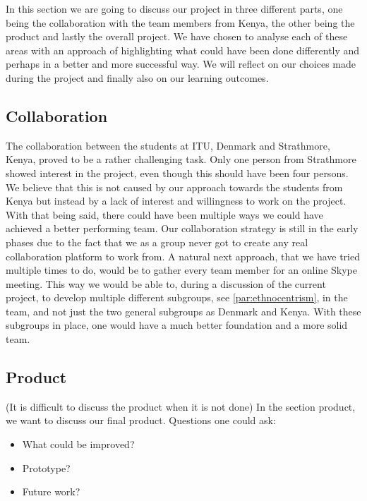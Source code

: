 In this section we are going to discuss our project in three different parts, one being the collaboration with the team members from Kenya, the other being the product and lastly the overall project. We have chosen to analyse each of these areas with an approach of highlighting what could have been done differently and perhaps in a better and more successful way. We will reflect on our choices made during the project and finally also on our learning outcomes.

\subsection{Collaboration}\label{subsec:collaboration}
The collaboration between the students at ITU, Denmark and Strathmore, Kenya, proved to be a rather challenging task. Only one person from Strathmore showed interest in the project, even though this should have been four persons. We believe that this is not caused by our approach towards the students from Kenya but instead by a lack of interest and willingness to work on the project.
With that being said, there could have been multiple ways we could have achieved a better performing team. Our collaboration strategy is still in the early phases due to the fact that we as a group never got to create any real collaboration platform to work from. 
A natural next approach, that we have tried multiple times to do, would be to gather every team member for an online Skype meeting. This way we would be able to, during a discussion of the current project, to develop multiple different subgroups, see \ref{par:ethnocentrism}, in the team, and not just the two general subgroups as Denmark and Kenya. With these subgroups in place, one would have a much better foundation and a more solid team.

\subsection{Product}\label{subsec:product}
(It is difficult to discuss the product when it is not done)
In the section product, we want to discuss our final product. Questions one could ask:

\begin{itemize}
	\item What could be improved?
	\item Prototype?
	\item Future work?
\end{itemize}


